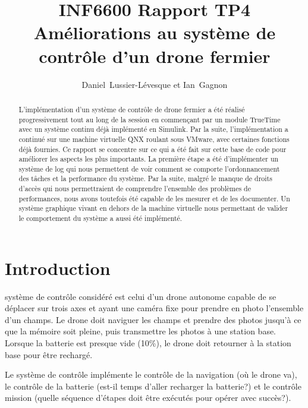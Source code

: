 \documentclass[journal]{IEEEtran}
\begin{document}
\title{INF6600 Rapport TP4 \\ Améliorations au système de contrôle d'un drone fermier}


\author{Daniel~Lussier-Lévesque et Ian~Gagnon}

\maketitle

\begin{abstract}
L'implémentation d'un système de contrôle de drone fermier a été réalisé progressivement tout au long de la session en commençant par un module TrueTime avec un système continu déjà implémenté en Simulink. Par la suite, l'implémentation a continué sur une machine virtuelle QNX roulant sous VMware, avec certaines fonctions déjà fournies. Ce rapport se concentre sur ce qui a été fait sur cette base de code pour améliorer les aspects les plus importants. La première étape a été d'implémenter un système de log qui nous permettent de voir comment se comporte l'ordonnancement des tâches et la performance du système. Par la suite, malgré le manque de droits d'accès qui nous permettraient de comprendre l'ensemble des problèmes de performances, nous avons toutefois été capable de les mesurer et de les documenter. Un système graphique vivant en dehors de la machine virtuelle nous permettant de valider le comportement du système a aussi été implémenté.
\end{abstract}


\section{Introduction}
 système de contrôle considéré est celui d'un drone autonome capable de se déplacer sur trois axes et ayant une caméra fixe pour prendre en photo l'ensemble d'un champs. Le drone doit naviguer les champs et prendre des photos jusqu'à ce que la mémoire soit pleine, puis transmettre les photos à une station base. Lorsque la batterie est presque vide (10\%), le drone doit retourner à la station base pour être rechargé. 

Le système de contrôle implémente le contrôle de la navigation (où le drone va), le contrôle de la batterie (est-il temps d'aller recharger la batterie?) et le contrôle mission (quelle séquence d'étapes doit être exécutés pour opérer avec succès?).
\end{document}
